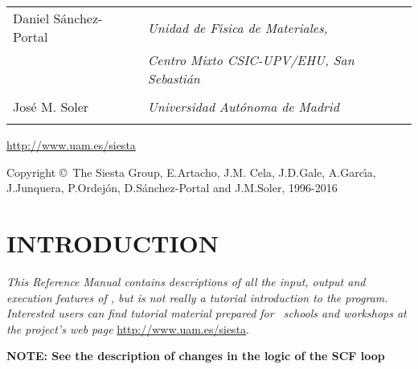 \begin{titlepage}
\begin{center}
{\begin{tabular}{ll}
{\Large Daniel S\'anchez-Portal} &
   \Large\textit{Unidad de F\'{\i}sica de Materiales,} \\
                                 &
   \Large\textit{Centro Mixto CSIC-UPV/EHU, San Sebasti\'an} \\ \\

{\Large Jos\'e M. Soler} &
   \Large\textit{Universidad Aut\'onoma de Madrid} \\ \\

\end{tabular}
}

\vspace{0.5cm}
{\Large \url{http://www.uam.es/siesta}}

\vspace{0.5cm}
Copyright \copyright\  The Siesta Group,
E.Artacho, J.M. Cela, J.D.Gale, A.Garc\'{\i}a, J.Junquera, P.Ordej\'on,
D.S\'anchez-Portal and J.M.Soler, 1996-2016

\end{center}

\end{titlepage}


\newpage

\tableofcontents

\newpage

\section{INTRODUCTION}

\textit{This Reference Manual contains descriptions of all the input,
  output and execution features of \siesta, but is not really a
  tutorial introduction to the program. Interested users can find
  tutorial material prepared for \siesta\ schools and workshops at
  the project's web page} \url{http://www.uam.es/siesta}.


\textbf{NOTE: See the description of changes in the logic of the SCF loop}

